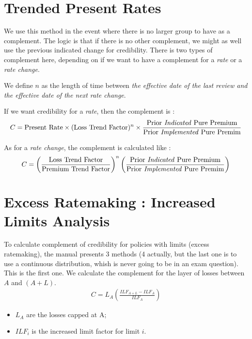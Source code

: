 \documentclass[11pt, english]{memoir}
\numberwithin{definition}{section}
\begin{document}
\section{Trended Present Rates}
We use this method in the event where there is no larger group to have as a complement. The logic is that if there is no other complement, we might as well use the previous indicated change for credibility. There is two types of complement here, depending  on if we want to have a complement for a \emph{rate} or a \emph{rate change}. 

We define $ n $ as the length of time between \emph{the effective date of the last review and the effective date of the next rate change}. 

If we want credibility for a \emph{rate}, then the complement is :
\begin{align*}
C = \text{Present Rate}\times (\text{Loss Trend Factor})^{n} \times \frac{\text{Prior \emph{Indicated} Pure Premium}}{\text{Prior \emph{Implemented} Pure Premim}}
\end{align*}

As for a \emph{rate change}, the complement is calculated like :
\begin{align*}
C = \left(\frac{\text{Loss Trend Factor}}{\text{Premium Trend Factor}}\right)^{n} \left(\frac{\text{Prior \emph{Indicated} Pure Premium}}{\text{Prior \emph{Implemented} Pure Premim}}\right) 
\end{align*}






\section{Excess Ratemaking : Increased Limits Analysis}
To calculate complement of credibility for policies with limits (excess ratemaking), the manual presents 3 methods (4 actually, but the last one is to use a continuous distribution, whish is never going to be in an exam question). This is the first one. We calculate the complement for the layer of losses between $ A $ and $ (A + L) $. 
\begin{align*}
C = L_{A} \left( \frac{ILF_{A+L} - ILF_{A}}{ILF_{A}} \right) 
\end{align*}
\begin{itemize}
	\item $ L_{A} $ are the losses capped at A; 
	\item $ ILF_{i} $ is the increased limit factor for limit $ i $. 
\end{itemize}
\end{document}
